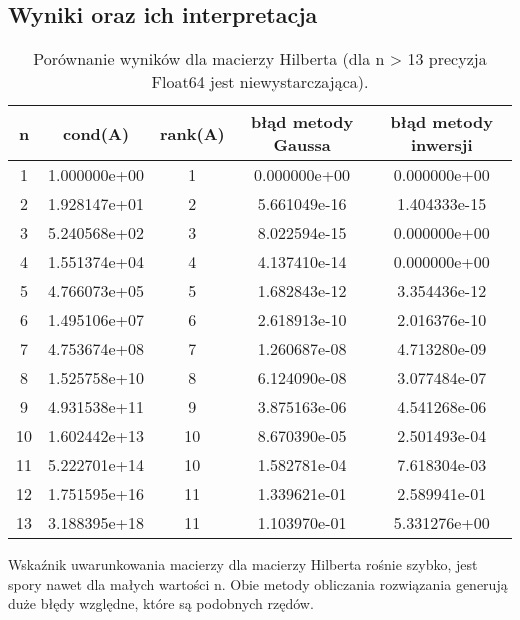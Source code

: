 \documentclass{article}
\begin{document}
\subsection{Wyniki oraz ich interpretacja}
\begin{table}[H]
\centering
\begin{tabular}{|c|c|c|c|c|}
\hline
	n & cond(A) & rank(A) & błąd metody Gaussa & błąd metody inwersji\\
\hline
	1 & 1.000000e+00 & 1 & 0.000000e+00 & 0.000000e+00\\
\hline
	2 & 1.928147e+01 & 2 & 5.661049e-16 & 1.404333e-15\\
\hline
	3 & 5.240568e+02 & 3 & 8.022594e-15 & 0.000000e+00\\
\hline
	4 & 1.551374e+04 & 4 & 4.137410e-14 & 0.000000e+00\\
\hline
	5 & 4.766073e+05 & 5 & 1.682843e-12 & 3.354436e-12\\
\hline
	6 &         1.495106e+07 &    6 &         2.618913e-10 &    2.016376e-10\\
\hline
	 7 &         4.753674e+08 &    7 &         1.260687e-08 &    4.713280e-09\\
\hline
	8 &         1.525758e+10 &    8 &         6.124090e-08 &    3.077484e-07\\
\hline
	9 &         4.931538e+11 &    9 &         3.875163e-06 &    4.541268e-06\\
\hline
	10 &         1.602442e+13 &   10 &         8.670390e-05 &    2.501493e-04\\
\hline
	11 &         5.222701e+14 &   10 &         1.582781e-04 &    7.618304e-03\\
\hline
	12 &         1.751595e+16 &   11 &         1.339621e-01 &    2.589941e-01\\
\hline
	13 &         3.188395e+18 &   11 &         1.103970e-01 &    5.331276e+00\\
\hline

\end{tabular}
\caption{Porównanie wyników dla macierzy Hilberta (dla n > 13 precyzja Float64 jest niewystarczająca).}
\end{table}
Wskaźnik uwarunkowania macierzy dla macierzy Hilberta rośnie szybko, jest spory nawet dla małych wartości n. Obie metody obliczania rozwiązania generują duże błędy względne, które są podobnych rzędów.
\end{document}
